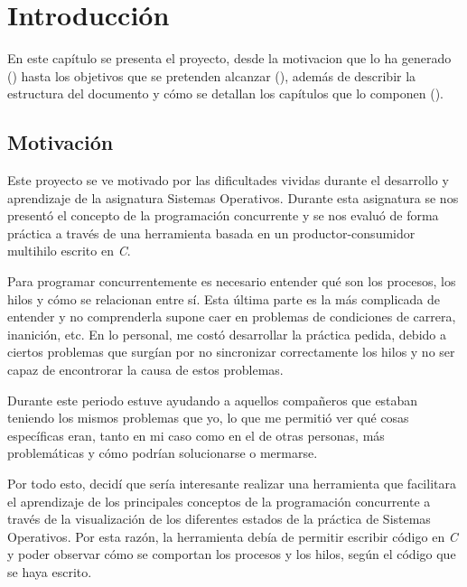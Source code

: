 \chapter{Introducción}\label{chap:introduccion}
En este capítulo se presenta el proyecto, desde la motivacion que lo ha generado () hasta los objetivos que se pretenden alcanzar (), además de describir la estructura del documento y cómo se detallan los capítulos que lo componen ().

\section{Motivación}\label{sec:motivacion}
Este proyecto se ve motivado por las dificultades vividas durante el desarrollo y aprendizaje de la asignatura Sistemas Operativos. Durante esta asignatura se nos presentó el concepto de la programación concurrente y se nos evaluó de forma práctica a través de una herramienta basada en un productor-consumidor multihilo escrito en \textit{C}.

Para programar concurrentemente es necesario entender qué son los procesos, los hilos y cómo se relacionan entre sí.
Esta última parte es la más complicada de entender y no comprenderla supone caer en problemas de condiciones de carrera, inanición, etc.
En lo personal, me costó desarrollar la práctica pedida, debido a ciertos problemas que surgían por no sincronizar correctamente los hilos y no ser capaz de encontrorar la causa de estos problemas.

Durante este periodo estuve ayudando a aquellos compañeros que estaban teniendo los mismos problemas que yo, lo que me permitió ver qué cosas específicas eran, tanto en mi caso como en el de otras personas, más problemáticas y cómo podrían solucionarse o mermarse.

Por todo esto, decidí que sería interesante realizar una herramienta que facilitara el aprendizaje de los principales conceptos de la programación concurrente a través de la visualización de los diferentes estados de la práctica de Sistemas Operativos. Por esta razón, la herramienta debía de permitir escribir código en \textit{C} y poder observar cómo se comportan los procesos y los hilos, según el código que se haya escrito.\\

